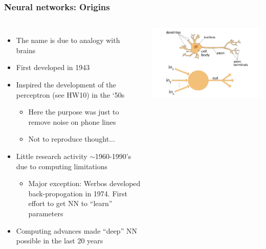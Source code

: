 \documentclass[mathserif, aspectratio=169]{beamer}
\begin{document}
\begin{frame}
	\frametitle{Neural networks: Origins}
	\begin{columns}[c]
			\begin{itemize}
				\item The name is due to analogy with brains
				\item First developed in 1943
				\item Inspired the development of the perceptron (see HW10) in the `50s
				\begin{itemize}
					\item Here the purpose was just to remove noise on phone lines
					\item Not to reproduce thought...
				\end{itemize}
				\item Little research activity $\sim$1960-1990's due to computing limitations
				\begin{itemize}
					\item Major exception: Werbos developed back-propogation in 1974.  First effort to get NN to ``learn'' parameters
				\end{itemize}
				\item Computing advances made ``deep'' NN possible in the last 20 years
			\end{itemize}
			\includegraphics[width=\textwidth]{nn_v_ann}
	\end{columns}
\end{frame}
\end{document}
